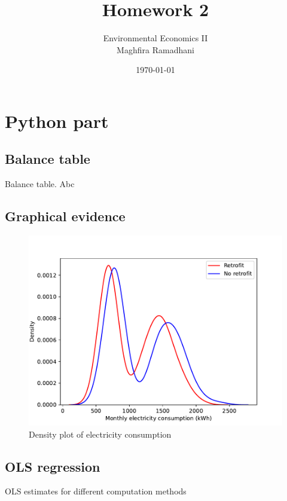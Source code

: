 \documentclass{article}
\newcommand{\bib}{references.bib}
\begin{document}
 
\title{Homework 2}
\author{Environmental Economics II\\
Maghfira Ramadhani}
\date{\today}
\maketitle

\section{Python part}
\subsection{Balance table}

\begin{table}[H]
    \centering
    
    \caption{Balance table. Abc}
    \label{t1:balance}
\end{table}

\subsection{Graphical evidence}

\begin{figure}[H]
    \centering
    \caption{Density plot of electricity consumption}
    \label{f1:hist}
    \includegraphics[scale = 0.6]{./figure/2_hist.pdf}
\end{figure}

\subsection{OLS regression}

\begin{table}[H]
    \centering
    \caption{OLS estimates for different computation methods}
    \label{t3:ols}
    
\end{table}


\cite{zm2009}


\end{document}
